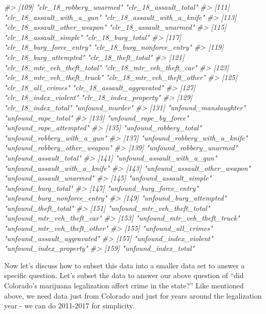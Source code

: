 \documentclass[
  12pt,
]{book}
\newenvironment{Shaded}{\begin{snugshade}}{\end{snugshade}}
\newcommand{\CommentTok}[1]{\textcolor[rgb]{0.56,0.35,0.01}{\textit{#1}}}
\begin{document}
\begin{Shaded}
\begin{Highlighting}[]
\CommentTok{\#> [109] "clr\_18\_robbery\_unarmed"         "clr\_18\_assault\_total"          }
\CommentTok{\#> [111] "clr\_18\_assault\_with\_a\_gun"      "clr\_18\_assault\_with\_a\_knife"   }
\CommentTok{\#> [113] "clr\_18\_assault\_other\_weapon"    "clr\_18\_assault\_unarmed"        }
\CommentTok{\#> [115] "clr\_18\_assault\_simple"          "clr\_18\_burg\_total"             }
\CommentTok{\#> [117] "clr\_18\_burg\_force\_entry"        "clr\_18\_burg\_nonforce\_entry"    }
\CommentTok{\#> [119] "clr\_18\_burg\_attempted"          "clr\_18\_theft\_total"            }
\CommentTok{\#> [121] "clr\_18\_mtr\_veh\_theft\_total"     "clr\_18\_mtr\_veh\_theft\_car"      }
\CommentTok{\#> [123] "clr\_18\_mtr\_veh\_theft\_truck"     "clr\_18\_mtr\_veh\_theft\_other"    }
\CommentTok{\#> [125] "clr\_18\_all\_crimes"              "clr\_18\_assault\_aggravated"     }
\CommentTok{\#> [127] "clr\_18\_index\_violent"           "clr\_18\_index\_property"         }
\CommentTok{\#> [129] "clr\_18\_index\_total"             "unfound\_murder"                }
\CommentTok{\#> [131] "unfound\_manslaughter"           "unfound\_rape\_total"            }
\CommentTok{\#> [133] "unfound\_rape\_by\_force"          "unfound\_rape\_attempted"        }
\CommentTok{\#> [135] "unfound\_robbery\_total"          "unfound\_robbery\_with\_a\_gun"    }
\CommentTok{\#> [137] "unfound\_robbery\_with\_a\_knife"   "unfound\_robbery\_other\_weapon"  }
\CommentTok{\#> [139] "unfound\_robbery\_unarmed"        "unfound\_assault\_total"         }
\CommentTok{\#> [141] "unfound\_assault\_with\_a\_gun"     "unfound\_assault\_with\_a\_knife"  }
\CommentTok{\#> [143] "unfound\_assault\_other\_weapon"   "unfound\_assault\_unarmed"       }
\CommentTok{\#> [145] "unfound\_assault\_simple"         "unfound\_burg\_total"            }
\CommentTok{\#> [147] "unfound\_burg\_force\_entry"       "unfound\_burg\_nonforce\_entry"   }
\CommentTok{\#> [149] "unfound\_burg\_attempted"         "unfound\_theft\_total"           }
\CommentTok{\#> [151] "unfound\_mtr\_veh\_theft\_total"    "unfound\_mtr\_veh\_theft\_car"     }
\CommentTok{\#> [153] "unfound\_mtr\_veh\_theft\_truck"    "unfound\_mtr\_veh\_theft\_other"   }
\CommentTok{\#> [155] "unfound\_all\_crimes"             "unfound\_assault\_aggravated"    }
\CommentTok{\#> [157] "unfound\_index\_violent"          "unfound\_index\_property"        }
\CommentTok{\#> [159] "unfound\_index\_total"}
\end{Highlighting}
\end{Shaded}

Now let's discuss how to subset this data into a smaller data set to answer a specific question. Let's subset the data to answer our above question of ``did Colorado's marijuana legalization affect crime in the state?'' Like mentioned above, we need data just from Colorado and just for years around the legalization year - we can do 2011-2017 for simplicity.
\end{document}

